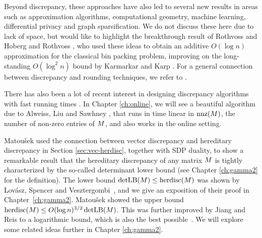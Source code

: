 Beyond discrepancy, these approaches have also led to several new results in areas such as approximation algorithms, computational geometry, machine learning, differential privacy and graph sparsification. We do not discuss these here due to lack of space, but would like to highlight the breakthrough result of Rothvoss \cite{Rothvoss16} and Hoberg and Rothvoss  \cite{HobergR19}, who used these ideas to obtain an additive $O(\log n)$ approximation for the classical bin packing problem, improving on the long-standing $O(\log^2 n)$ bound by Karmarkar and Karp \cite{KarmarkarK82}. For a general connection between discrepancy and rounding techniques, we refer to \cite{Bansal19}.

There has also been a lot of recent interest in designing discrepancy algorithms with fast running times \cite{JainSS23, JambulapatiRT24}. In Chapter \ref{ch:online}, we will see a beautiful algorithm due to Alweiss, Liu and Sawhney \cite{alweiss2020discrepancy}, that runs in time linear in $\text{nnz}(M)$, the number of non-zero entries of $M$, and also works in the online setting.

Matou\v{s}ek \cite{Matousek-detlb} used the connection between vector discrepancy and hereditary discrepancy in Section \ref{sec:vec-herdisc}, together with SDP duality, to show a remarkable result that the hereditary discrepancy of any matrix $M$ is tightly characterized by the so-called determinant lower bound (see Chapter \ref{ch:gamma2} for the definition). The lower bound  $\operatorname{detLB}(M) \leq \operatorname{herdisc}(M)$ was shown by Lov\'asz, Spencer and Vesztergombi~\cite{LSV}, and we give an exposition of their proof in Chapter~\ref{ch:gamma2}. Matou\v{s}ek showed the upper bound $\operatorname{herdisc}(M) \leq O(\log n)^{3/2} \operatorname{detLB}(M)$.
This was further improved by Jiang and Reis \cite{JiangReis22} to a logarithmic bound, which is also the best possible~\cite{LiNikolov24}.
We will explore some related ideas further in Chapter \ref{ch:gamma2}. 




